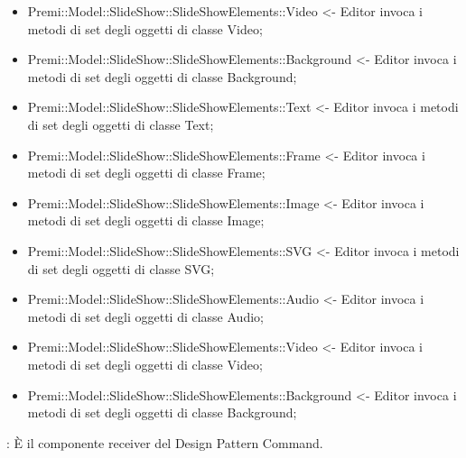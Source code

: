 {{\begin{itemize}
           \item Premi::Model::SlideShow::SlideShowElements::Video <- Editor invoca i metodi di set degli oggetti di classe Video;
           \item Premi::Model::SlideShow::SlideShowElements::Background <- Editor invoca i metodi di set degli oggetti di classe Background;
           \item Premi::Model::SlideShow::SlideShowElements::Text <- Editor invoca i metodi di set degli oggetti di classe Text;
           \item Premi::Model::SlideShow::SlideShowElements::Frame <- Editor invoca i metodi di set degli oggetti di classe Frame;
           \item Premi::Model::SlideShow::SlideShowElements::Image <- Editor invoca i metodi di set degli oggetti di classe Image;
           \item Premi::Model::SlideShow::SlideShowElements::SVG <- Editor invoca i metodi di set degli oggetti di classe SVG;
           \item Premi::Model::SlideShow::SlideShowElements::Audio <- Editor invoca i metodi di set degli oggetti di classe Audio;
           \item Premi::Model::SlideShow::SlideShowElements::Video <- Editor invoca i metodi di set degli oggetti di classe Video;
           \item Premi::Model::SlideShow::SlideShowElements::Background <- Editor invoca i metodi di set degli oggetti di classe Background;
		\end{itemize} 
		\textbf{\interfacce}: È il componente receiver del Design Pattern Command.\\
	}	
	}
